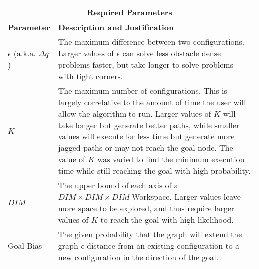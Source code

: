 \begin{table}[H]
\begin{center}
\begin{tabular}{|p{.2\linewidth}|p{.74\linewidth}|}
    \hline
    \multicolumn{2}{|c|}{\textbf{Required Parameters}} \\
    \hline
    \textbf{Parameter}   & \textbf{Description and Justification} \\
    \hline
    $\epsilon$ (a.k.a. $\Delta q$) & 
        The maximum difference between two configurations. Larger values of $\epsilon$ can solve less obstacle dense problems faster, but take longer to solve problems with tight corners.\\
    \hline
    $K$ &
        The maximum number of configurations. This is largely correlative to the amount of time the user will allow the algorithm to run. Larger values of $K$ will take longer but generate better paths, while smaller values will execute for less time but generate more jagged paths or may not reach the goal node. The value of $K$ was varied to find the minimum execution time while still reaching the goal with high probability. \\
    \hline
    $DIM$ &
        The upper bound of each axis of a $DIM\times DIM\times DIM$ Workspace. Larger values leave more space to be explored, and thus require larger values of $K$ to reach the goal with high likelihood. \\
    \hline
    Goal Bias &
        The given probability that the graph will extend the graph $\epsilon$ distance from an existing configuration to a new configuration in the direction of the goal. \\
    \hline
\end{tabular}
\label{table:RRT_Tech_Specs_Parameters}
\end{center}
\end{table}